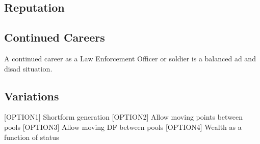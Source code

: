 \subsection{Reputation}

\subsection*{Continued Careers}
A continued career as a Law Enforcement Officer or soldier is a
balanced ad and disad situation.

\subsection{Variations}

[OPTION1] Shortform generation
[OPTION2] Allow moving points between pools
[OPTION3] Allow moving DF between pools
[OPTION4] Wealth as a function of status


